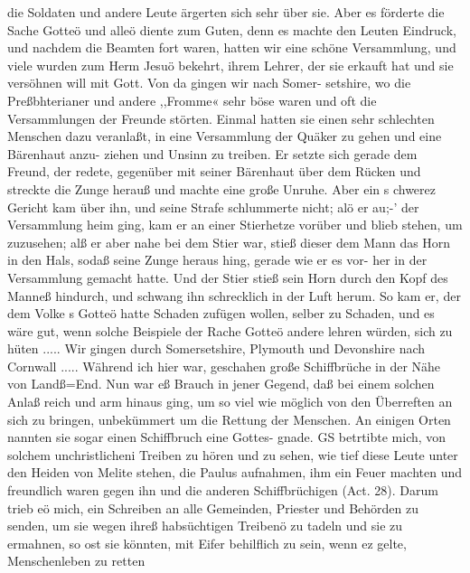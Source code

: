 die Soldaten und andere Leute ärgerten sich sehr über sie. Aber
es förderte die Sache Gotteö und alleö diente zum Guten, denn
es machte den Leuten Eindruck, und nachdem die Beamten fort
waren, hatten wir eine schöne Versammlung, und viele wurden
zum Herm Jesuö bekehrt, ihrem Lehrer, der sie erkauft hat und
sie versöhnen will mit Gott. Von da gingen wir nach Somer-
setshire, wo die Preßbhterianer und andere ,,Fromme« sehr böse
waren und oft die Versammlungen der Freunde störten. Einmal
hatten sie einen sehr schlechten Menschen dazu veranlaßt, in eine
Versammlung der Quäker zu gehen und eine Bärenhaut anzu-
ziehen und Unsinn zu treiben. Er setzte sich gerade dem Freund,
der redete, gegenüber mit seiner Bärenhaut über dem Rücken
und streckte die Zunge herauß und machte eine große Unruhe.
Aber ein s chwerez Gericht kam über ihn, und seine Strafe schlummerte
nicht; alö er au;-’ der Versammlung heim ging, kam er an einer
Stierhetze vorüber und blieb stehen, um zuzusehen; alß er aber
nahe bei dem Stier war, stieß dieser dem Mann das Horn in
den Hals, sodaß seine Zunge heraus hing, gerade wie er es vor-
her in der Versammlung gemacht hatte. Und der Stier stieß
sein Horn durch den Kopf des Manneß hindurch, und schwang
ihn schrecklich in der Luft herum. So kam er, der dem Volke s
Gotteö hatte Schaden zufügen wollen, selber zu Schaden, und
es wäre gut, wenn solche Beispiele der Rache Gotteö andere lehren
würden, sich zu hüten .....
Wir gingen durch Somersetshire, Plymouth und Devonshire
nach Cornwall ..... Während ich hier war, geschahen große
Schiffbrüche in der Nähe von Landß=End. Nun war eß Brauch
in jener Gegend, daß bei einem solchen Anlaß reich und arm
hinaus ging, um so viel wie möglich von den Überreften an
sich zu bringen, unbekümmert um die Rettung der Menschen. An
einigen Orten nannten sie sogar einen Schiffbruch eine Gottes-
gnade. GS betrtibte mich, von solchem unchristlicheni Treiben zu
hören und zu sehen, wie tief diese Leute unter den Heiden von
Melite stehen, die Paulus aufnahmen, ihm ein Feuer machten
und freundlich waren gegen ihn und die anderen Schiffbrüchigen
(Act. 28). Darum trieb eö mich, ein Schreiben an alle Gemeinden,
Priester und Behörden zu senden, um sie wegen ihreß habsüchtigen
Treibenö zu tadeln und sie zu ermahnen, so ost sie könnten, mit
Eifer behilflich zu sein, wenn ez gelte, Menschenleben zu retten


